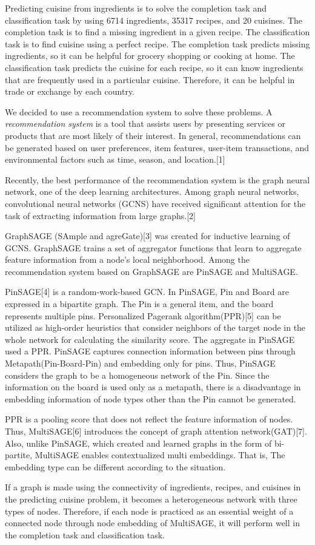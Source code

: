 Predicting cuisine from ingredients is to solve the completion task and classification task by using 6714 ingredients, 35317 recipes, and 20 cuisines.
The completion task is to find a missing ingredient in a given recipe.
The classification task is to find cuisine using a perfect recipe.
The completion task predicts missing ingredients, so it can be helpful for grocery shopping or cooking at home.
The classification task predicts the cuisine for each recipe, so it can know ingredients that are frequently used in a particular cuisine.
Therefore, it can be helpful in trade or exchange by each country.

We decided to use a recommendation system to solve these problems.
A \emph{recommendation system} is a tool that assists users by presenting services or products that are most likely of their interest.
In general, recommendations can be generated based on user preferences, item features, user-item transactions, and environmental factors such as time, season, and location.[1]

Recently, the best performance of the recommendation system is the graph neural network, one of the deep learning architectures.
Among graph neural networks, convolutional neural networks (GCNS) have received significant attention for the task of extracting information from large graphs.[2] 

GraphSAGE (SAmple and agreGate)[3] was created for inductive learning of GCNS.
GraphSAGE trains a set of aggregator functions that learn to aggregate feature information from a node's local neighborhood.
Among the recommendation system based on GraphSAGE are PinSAGE and  MultiSAGE.

PinSAGE[4] is a random-work-based GCN. In PinSAGE, Pin and Board are expressed in a bipartite graph.
The Pin is a general item, and the board represents multiple pins.
Personalized Pagerank algorithm(PPR)[5] can be utilized as high-order heuristics that consider neighbors of the target node in the whole network for calculating the similarity score.
The aggregate in PinSAGE used a PPR.
PinSAGE captures connection information between pins through Metapath(Pin-Board-Pin) and embedding only for pins.
Thus, PinSAGE considers the graph to be a homogeneous network of the Pin.
Since the information on the board is used only as a metapath, there is a disadvantage in embedding information of node types other than the Pin cannot be generated.

PPR is a pooling score that does not reflect the feature information of nodes.
Thus, MultiSAGE[6] introduces the concept of graph attention network(GAT)[7].
Also, unlike PinSAGE, which created and learned graphs in the form of bi-partite, MultiSAGE enables contextualized multi embeddings.
That is, The embedding type can be different according to the situation.

If a graph is made using the connectivity of ingredients, recipes, and cuisines in the predicting cuisine problem, it becomes a heterogeneous network with three types of nodes.
Therefore, if each node is practiced as an essential weight of a connected node through node embedding of MultiSAGE, it will perform well in the completion task and classification task.
